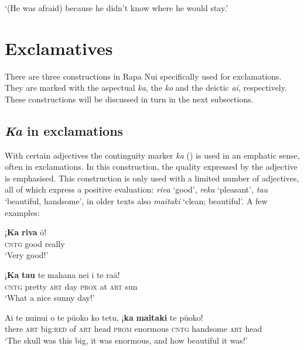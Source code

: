 \glt 
‘(He was afraid) because he didn’t know where he would stay.’ \textstyleExampleref{[R314.016]} 
\z
{}

\section{Exclamatives}\label{sec:10.4}
There are three constructions in Rapa Nui specifically used for exclamations. They are marked with the aspectual \textit{ka}, the  \textit{ko} and the deictic  \textit{{\ꞌ}ai}, respectively. These constructions will be discussed in turn in the next subsections.

\subsection{\textit{Ka} in exclamations}\label{sec:10.4.1}
With certain adjectives the continguity marker \textit{ka} () is used in an emphatic sense, often in exclamations. In this construction, the quality expressed by the adjective is emphasised. This construction is only used with a limited number of adjectives, all of which express a positive evaluation: \textit{riva} ‘good’, \textit{reka} ‘pleasant’, \textit{tau} ‘beautiful, handsome’, in older texts also \textit{ma{\ꞌ}itaki} ‘clean; beautiful’. A few examples:

\ea\label{ex:10.77}
\gll ¡\textbf{Ka} \textbf{riva} {\ꞌ}ō! \\
\textsc{cntg} good really \\

\glt 
‘Very good!’ \textstyleExampleref{[R334.319]} 
\z

\ea\label{ex:10.78}
\gll ¡\textbf{Ka} \textbf{tau} te mahana nei {\ꞌ}i te ra{\ꞌ}ā! \\
\textsc{cntg} pretty \textsc{art} day \textsc{prox} at \textsc{art} sun \\

\glt 
‘What a nice sunny day!’ \textstyleExampleref{[Notes]}
\z

\ea\label{ex:10.79}
\gll {\ꞌ}Ai te nuinui o te pū{\ꞌ}oko ko tetu, ¡\textbf{ka} \textbf{ma{\ꞌ}itaki} te pū{\ꞌ}oko! \\
there \textsc{art} big:\textsc{red} of \textsc{art} head \textsc{prom} enormous \textsc{cntg} handsome \textsc{art} head \\

\glt
‘The skull was this big, it was enormous, and how beautiful it was!’ \textstyleExampleref{[Ley-2-10.010]}
\z

